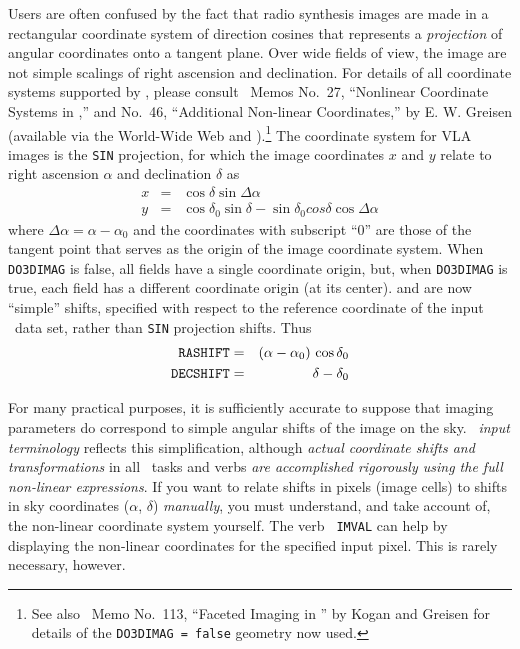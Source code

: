      Users are often confused by the fact that radio synthesis images
are made in a rectangular coordinate system of direction cosines that
represents a {\it projection\/} of angular coordinates onto a tangent
plane.  Over wide fields of view, the image  are not
simple scalings of right ascension and declination.  For details of
all coordinate systems supported by \AIPS, please consult \AIPS\ Memos
No.~27, ``Nonlinear Coordinate Systems in \AIPS,'' and No.~46,
``Additional Non-linear Coordinates,'' by E. W. Greisen (available via
the World-Wide Web  and ).\footnote{See also
\AIPS\ Memo No.~113, ``Faceted Imaging in \AIPS'' by Kogan and Greisen
for details of the {\tt DO3DIMAG = false} geometry now used.}  The
coordinate system for VLA images is the {\tt SIN} projection, for
which the image coordinates $x$ and $y$ relate to right ascension
$\alpha$ and declination $\delta$ as
\begin{eqnarray*}
x & = & \cos\delta\sin\Delta\alpha \\
y & = & \cos\delta_0\sin\delta - \sin\delta_0cos\delta\cos\Delta\alpha
\end{eqnarray*}
where $\Delta\alpha = \alpha-\alpha_0$ and the coordinates with
subscript ``0'' are those of the tangent point that serves as the
origin of the image coordinate system.  When {\tt DO3DIMAG} is false,
all fields have a single coordinate origin, but, when {\tt DO3DIMAG}
is true, each field has a different coordinate origin (at its center).
{\tt {}} and {\tt {}} are now ``simple''
shifts, specified with respect to the reference coordinate of the
input \uv\ data set, rather than {\tt SIN} projection shifts.  Thus
\begin{eqnarray*}
\hbox{{\tt RASHIFT}} & = & (\alpha - \alpha_0)\,\cos\delta_0 \\
\hbox{{\tt DECSHIFT}} & = & \delta - \delta_0
\end{eqnarray*}

     For many practical purposes, it is sufficiently accurate to
suppose that imaging parameters do correspond to simple angular shifts
of the image on the sky.  \AIPS\ {\it input terminology\/} reflects
this simplification, although {\it actual coordinate shifts and
transformations} in all \AIPS\ tasks and verbs {\it are accomplished
rigorously using the full non-linear expressions\/}.  If you want to
relate shifts in pixels (image cells) to shifts in sky coordinates
($\alpha$, $\delta$) {\it manually\/}, you must understand, and take
account of, the non-linear coordinate system yourself.  The verb {\tt
IMVAL} can help by displaying the non-linear coordinates for the
specified input pixel.  This is rarely necessary, however.

